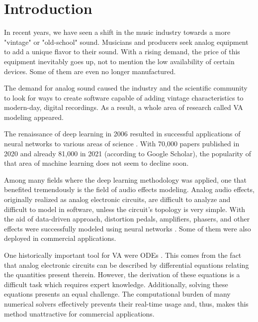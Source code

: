 \chapter{Introduction}
\label{chap:Introduction}

In recent years, we have seen a shift in the music industry towards a more "vintage" or "old-school" sound. Musicians and producers seek analog equipment to add a unique flavor to their sound. With a rising demand, the price of this equipment inevitably goes up, not to mention the low availability of certain devices. Some of them are even no longer manufactured.

The demand for analog sound caused the industry and the scientific community to look for ways to create software capable of adding vintage characteristics to modern-day, digital recordings. As a result, a whole area of research called \acf{VA} modeling appeared.

The renaissance of deep learning in 2006 resulted in successful applications of neural networks to various areas of science \cite{Goodfellow-et-al-2016}. With 70,000 papers published in 2020 and already 81,000 in 2021 (according to Google Scholar), the popularity of that area of machine learning does not seem to decline soon.

Among many fields where the deep learning methodology was applied, one that benefited tremendously is the field of audio effects modeling. Analog audio effects, originally realized as analog electronic circuits, are difficult to analyze and difficult to model in software, unless the circuit's topology is very simple. With the aid of data-driven approach, distortion pedals, amplifiers, phasers, and other effects were successfully modeled using neural networks \cite{Parker2019,Wright2019,Wright2019a,Wright2020}. Some of them were also deployed in commercial applications.

One historically important tool for \ac{VA} were \acfp{ODE} \cite{Yeh2007,Yeh2008}. This comes from the fact that analog electronic circuits can be described by differential equations relating the quantities present therein. However, the derivation of these equations is a difficult task which requires expert knowledge. Additionally, solving these equations presents an equal challenge. The computational burden of many numerical solvers effectively prevents their real-time usage and, thus, makes this method unattractive for commercial applications.

